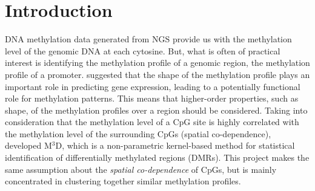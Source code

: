 \section{Introduction} \label{motivation-meth-l}
DNA methylation data generated from NGS provide us with the methylation level of the genomic DNA at each cytosine. But, what is often of practical interest is identifying the methylation profile of a genomic region, \eg the methylation profile of a promoter. \cite{Vanderkraats2013} suggested that the shape of the methylation profile plays an important role in predicting gene expression, leading to a potentially functional role for methylation patterns. This means that higher-order properties, such as shape, of the methylation profiles over a region should be considered. Taking into consideration that the methylation level of a CpG site is highly correlated with the methylation level of the surrounding CpGs (\ie spatial co-dependence), \cite{Mayo2014} developed M$^3$D, which is a non-parametric kernel-based method for statistical identification of differentially methylated regions (DMRs). This project makes the same assumption about the \emph{spatial co-dependence} of CpGs, but is mainly concentrated in clustering together similar methylation profiles.